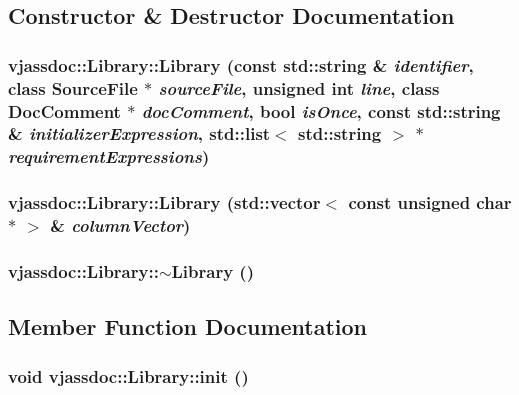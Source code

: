 \subsection{Constructor \& Destructor Documentation}
\hypertarget{classvjassdoc_1_1Library_9f69ca5b7692f0351f1ac263c9b3bf28}{
\subsubsection{\setlength{\rightskip}{0pt plus 5cm}vjassdoc::Library::Library (const std::string \& {\em identifier}, class {\bf SourceFile} $\ast$ {\em sourceFile}, unsigned int {\em line}, class {\bf DocComment} $\ast$ {\em docComment}, bool {\em isOnce}, const std::string \& {\em initializerExpression}, std::list$<$ std::string $>$ $\ast$ {\em requirementExpressions})}}
\label{classvjassdoc_1_1Library_9f69ca5b7692f0351f1ac263c9b3bf28}


\hypertarget{classvjassdoc_1_1Library_2e9ab1441cf3e30919312c8f3644f190}{
\subsubsection{\setlength{\rightskip}{0pt plus 5cm}vjassdoc::Library::Library (std::vector$<$ const unsigned char $\ast$ $>$ \& {\em columnVector})}}
\label{classvjassdoc_1_1Library_2e9ab1441cf3e30919312c8f3644f190}


\hypertarget{classvjassdoc_1_1Library_412120c44682db1ae36a04254583eb75}{
\subsubsection{\setlength{\rightskip}{0pt plus 5cm}vjassdoc::Library::$\sim$Library ()}}
\label{classvjassdoc_1_1Library_412120c44682db1ae36a04254583eb75}




\subsection{Member Function Documentation}
\hypertarget{classvjassdoc_1_1Library_d1bbc6153d45c040be60419a6708bd7d}{
\subsubsection{\setlength{\rightskip}{0pt plus 5cm}void vjassdoc::Library::init ()}}
\label{classvjassdoc_1_1Library_d1bbc6153d45c040be60419a6708bd7d}




